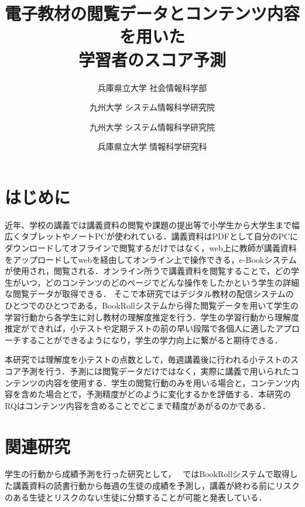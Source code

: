 \documentclass[platex,dvipdfmx,a4paper,twocolumn,base=10pt,jbase=10pt,ja=standard]{bxjsarticle}
\title{\Large\bf 電子教材の閲覧データとコンテンツ内容を用いた\\学習者のスコア予測}{\bf Predicting learner scores using browsing data and content of electronic learning materials}
\author{兵庫県立大学 社会情報科学部}{小岸 沙也加}{Sayaka Kogishi, University of Hyogo}
\author{九州大学 システム情報科学研究院}{峰松 翼}{Tsubasa Minematsu, Kyushu University}
\author{九州大学 システム情報科学研究院}{島田 敦士}{Atsushi Shimada, Kyushu University}
\author{兵庫県立大学 情報科学研究科}{川嶋 宏彰}{Hiroaki Kawashima, University of Hyogo}
\begin{document}
\maketitle

\section{はじめに}
\label{sec:intro}
    
近年、学校の講義では講義資料の閲覧や課題の提出等で小学生から大学生まで幅広くタブレットやノートPCが使われている．講義資料はPDFとして自分のPCにダウンロードしてオフラインで閲覧するだけではなく，web上に教師が講義資料をアップロードしてwebを経由してオンライン上で操作できる，e-Bookシステムが使用され，閲覧される．オンライン所うで講義資料を閲覧することで，どの学生がいつ，どのコンテンツのどのページでどんな操作をしたかという学生の詳細な閲覧データが取得できる．
そこで本研究ではデジタル教材の配信システムのひとつでのひとつである，BookRollシステムから得た閲覧データを用いて学生の学習行動から各学生に対し教材の理解度推定を行う．学生の学習行動から理解度推定ができれば，小テストや定期テストの前の早い段階で各個人に適したアプローチすることができるようになり，学生の学力向上に繋がると期待できる．


本研究では理解度を小テストの点数として，毎週講義後に行われる小テストのスコア予測を行う．予測には閲覧データだけではなく，実際に講義で用いられたコンテンツの内容を使用する．学生の閲覧行動のみを用いる場合と，コンテンツ内容を含めた場合とで，予測精度がどのように変化するかを評価する．本研究のRQはコンテンツ内容を含めることでどこまで精度があがるのかである．



\section{関連研究}
\label{sec:Related}

学生の行動から成績予測を行った研究として，
~\cite{Predictionstudentperformance2022}ではBookRollシステムで取得した講義資料の読書行動から毎週の生徒の成績を予測し，講義が終わる前にリスクのある生徒とリスクのない生徒に分類することが可能と発表している．
\end{document}
